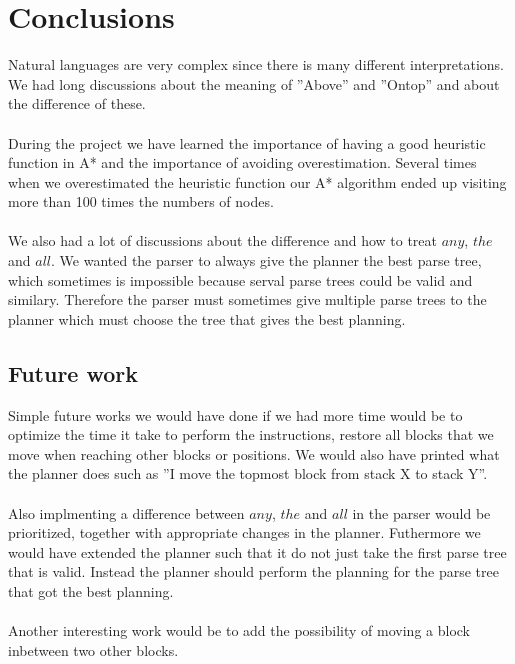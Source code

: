 \chapter{Conclusions}
Natural languages are very complex since there is many different
interpretations. We had long discussions about the meaning of ''Above'' and
''Ontop'' and about the difference of these.  
\\\\
During the project we have learned the importance of having a good heuristic
function in A* and the importance of avoiding overestimation.  Several times
when we overestimated the heuristic function our A* algorithm ended up visiting
more than 100 times the numbers of nodes. 
\\\\
We also had a lot of discussions about the difference and how to treat $any$,
$the$ and $all$. We wanted the parser to always give the planner the best parse
tree, which sometimes is impossible because serval parse trees could be valid
and similary. Therefore the parser must sometimes give multiple parse trees to
the planner which must choose the tree that gives the best planning.

\section{Future work}
Simple future works we would have done if we had more time would be to optimize
the time it take to perform the instructions, restore all blocks that we move
when reaching other blocks or positions. We would also have printed what the
planner does such as ''I move the topmost block from stack X to stack Y''.
\\\\
Also implmenting a difference between $any$, $the$ and $all$ in the parser
would be prioritized, together with appropriate changes in the planner.
Futhermore we would have extended the planner such that it do not just take the
first parse tree that is valid. Instead the planner should perform the planning
for the parse tree that got the best planning. 
\\\\
Another interesting work would be to add the possibility of moving a block
inbetween two other blocks. 
